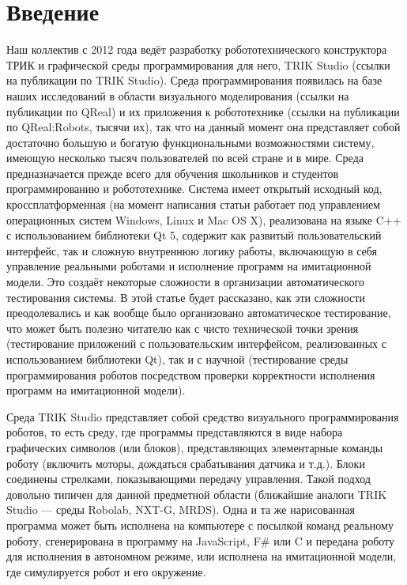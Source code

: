 ﻿\documentclass[conference]{IEEEtran}
\begin{document}
\section{Введение}
Наш коллектив с 2012 года ведёт разработку робототехнического конструктора ТРИК и 
графической среды программирования для него, TRIK Studio (ссылки на публикации по TRIK Studio). 
Среда программирования появилась на базе наших исследований в области визуального 
моделирования (ссылки на публикации по QReal) и их приложения к робототехнике (ссылки 
на публикации по QReal:Robots, тысячи их), так что на данный момент она представляет 
собой достаточно большую и богатую функциональными возможностями систему, имеющую 
несколько тысяч пользователей по всей стране и в мире. Среда предназначается прежде 
всего для обучения школьников и студентов программированию и робототехнике. Система 
имеет открытый исходный код, кроссплатформенная (на момент написания статьи работает 
под управлением операционных систем Windows, Linux и Mac OS X), реализована на языке 
C++ с использованием библиотеки Qt 5, содержит как развитый пользовательский интерфейс, 
так и сложную внутреннюю логику работы, включающую в себя управление реальными роботами 
и исполнение программ на имитационной модели. Это создаёт некоторые сложности в организации 
автоматического тестирования системы. В этой статье будет рассказано, как эти сложности 
преодолевались и как вообще было организовано автоматическое тестирование, что может 
быть полезно читателю как с чисто технической точки зрения (тестирование приложений 
с пользовательским интерфейсом, реализованных с использованием библиотеки Qt), так 
и с научной (тестирование среды программирования роботов посредством проверки корректности 
исполнения программ на имитационной модели).

Среда TRIK Studio представляет собой средство визуального программирования роботов, 
то есть среду, где программы представляются в виде набора графических символов (или 
блоков), представляющих элементарные команды роботу (включить моторы, дождаться срабатывания 
датчика и т.д.). Блоки соединены стрелками, показывающими передачу управления. Такой 
подход довольно типичен для данной предметной области (ближайшие аналоги TRIK Studio 
--- среды Robolab, NXT-G, MRDS). Одна и та же нарисованная программа может быть исполнена 
на компьютере с посылкой команд реальному роботу, сгенерирована в программу на JavaScript, 
F\# или C и передана роботу для исполнения в автономном режиме, или исполнена на имитационной 
модели, где симулируется робот и его окружение.
\end{document}
